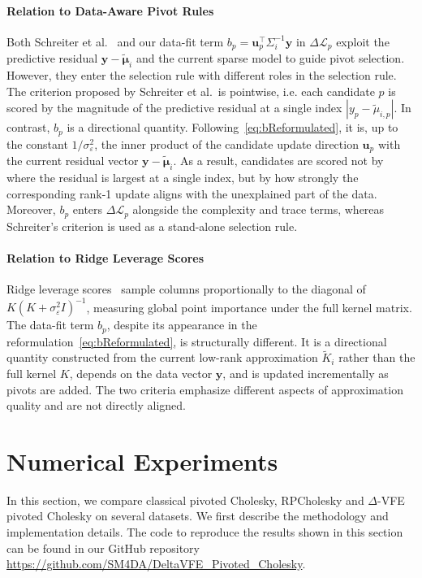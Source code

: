 \documentclass[onefignum,onetabnum]{siamart250211}
\begin{document}
\paragraph{Relation to Data-Aware Pivot Rules}
Both Schreiter et al.~\cite{schreiter.2016} and our data-fit term $b_p = \bm{u}_p^\top \Sigma_i^{-1} \bm{y}$ in $\Delta\mathcal{L}_p$ exploit the predictive residual $\bm{y} - \bm{\tilde{\mu}}_i$ and the current sparse model to guide pivot selection. However, they enter the selection rule with different roles in the selection rule. The criterion proposed by Schreiter et al.~is pointwise, i.e. each candidate $p$ is scored by the magnitude of the predictive residual at a single index $|y_p - \tilde{\mu}_{i,p}|$. In contrast, $b_p$ is a directional quantity. Following~\eqref{eq:bReformulated}, it is, up to the constant $1/\sigma_\varepsilon^2$, the inner product of the candidate update direction $\bm{u}_p$ with the current residual vector $\bm{y} - \bm{\tilde{\mu}}_i$. As a result, candidates are scored not by where the residual is largest at a single index, but by how strongly the corresponding rank-1 update aligns with the unexplained part of the data. Moreover, $b_p$ enters $\Delta\mathcal{L}_p$ alongside the complexity and trace terms, whereas Schreiter's criterion is used as a stand-alone selection rule. 

\paragraph{Relation to Ridge Leverage Scores}
Ridge leverage scores~\cite{alaoui.2015, musco.2017} sample columns proportionally to the diagonal of $K(K + \sigma_\varepsilon^2 I)^{-1}$, measuring global point importance under the full kernel matrix. The data-fit term $b_p$, despite its appearance in the reformulation~\eqref{eq:bReformulated}, is structurally different. It is a directional quantity constructed from the current low-rank approximation $\widetilde{K}_i$ rather than the full kernel $K$, depends on the data vector $\bm{y}$, and is updated incrementally as pivots are added. The two criteria emphasize different aspects of approximation quality and are not directly aligned.

\section{Numerical Experiments}\label{sec:experiments}
\sloppy
In this section, we compare classical pivoted Cholesky, RPCholesky and $\Delta$-VFE pivoted Cholesky on several datasets.
We first describe the methodology and implementation details. 
The code to reproduce the results shown in this section can be found in our GitHub repository \url{https://github.com/SM4DA/DeltaVFE_Pivoted_Cholesky}.
\end{document}
